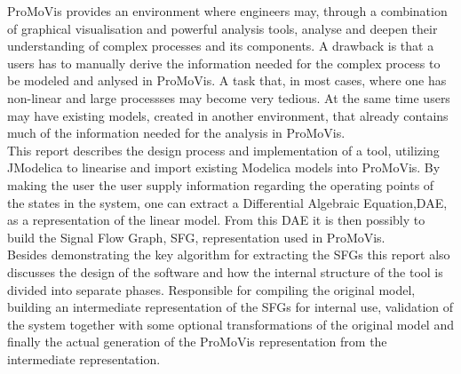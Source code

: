 ProMoVis provides an environment where engineers may, through a combination of graphical visualisation and powerful analysis tools, analyse and deepen their understanding of complex processes and its components. A drawback is that a users has to manually derive the information needed for the complex process to be modeled and anlysed in ProMoVis. A task that, in most cases, where one has non-linear and large processses may become very tedious. At the same time users may have existing models, created in another environment, that already contains much of the information needed for the analysis in ProMoVis.\\\newline This report describes the design process and implementation of a tool, utilizing JModelica to linearise and import existing Modelica models into ProMoVis. By making the user the user supply information regarding the operating points of the states in the system, one can extract a Differential Algebraic Equation,DAE, as a representation of the linear model. From this DAE it is then possibly to build the Signal Flow Graph, SFG, representation used in ProMoVis.\\\newline Besides demonstrating the key algorithm for extracting the SFGs this report also discusses the design of the software and how the internal structure of the tool is divided into separate phases. Responsible for compiling the original model, building an intermediate representation of the SFGs for internal use, validation of the system together with some optional transformations of the original model and finally the actual generation of the ProMoVis representation from the intermediate representation. 